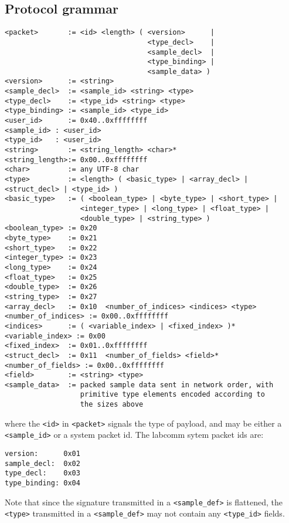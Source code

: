 \documentclass[a4paper]{article}
\begin{document}
\subsection{Protocol grammar}
\label{sec:ConcreteGrammar}
\begin{lstlisting}[basicstyle=\footnotesize\ttfamily]
<packet>       := <id> <length> ( <version>      | 
                                  <type_decl>    | 
                                  <sample_decl>  |
                                  <type_binding> |
                                  <sample_data> )
<version>      := <string>
<sample_decl>  := <sample_id> <string> <type>
<type_decl>    := <type_id> <string> <type>
<type_binding> := <sample_id> <type_id>
<user_id>      := 0x40..0xffffffff  
<sample_id> : <user_id>
<type_id>   : <user_id>
<string>       := <string_length> <char>*
<string_length>:= 0x00..0xffffffff  
<char>         := any UTF-8 char
<type>         := <length> ( <basic_type> | <array_decl> | <struct_decl> | <type_id> )
<basic_type>   := ( <boolean_type> | <byte_type> | <short_type> |
                  <integer_type> | <long_type> | <float_type> |
                  <double_type> | <string_type> )
<boolean_type> := 0x20 
<byte_type>    := 0x21 
<short_type>   := 0x22 
<integer_type> := 0x23 
<long_type>    := 0x24 
<float_type>   := 0x25 
<double_type>  := 0x26 
<string_type>  := 0x27 
<array_decl>   := 0x10  <number_of_indices> <indices> <type>
<number_of_indices> := 0x00..0xffffffff  
<indices>      := ( <variable_index> | <fixed_index> )*
<variable_index> := 0x00  
<fixed_index>  := 0x01..0xffffffff  
<struct_decl>  := 0x11  <number_of_fields> <field>*
<number_of_fields> := 0x00..0xffffffff  
<field>        := <string> <type>
<sample_data>  := packed sample data sent in network order, with
                  primitive type elements encoded according to
                  the sizes above
\end{lstlisting}
where the \verb+<id>+ in \verb+<packet>+ signals the type of payload,
and may be either a \verb+<sample_id>+ or a system packet id.
The labcomm sytem packet ids are:
\begin{lstlisting}[basicstyle=\footnotesize\ttfamily]
version:      0x01 
sample_decl:  0x02 
type_decl:    0x03 
type_binding: 0x04          
\end{lstlisting}
Note that since the signature transmitted in a \verb+<sample_def>+ is
flattened, the \verb+<type>+ transmitted in a \verb+<sample_def>+ may
not contain any \verb+<type_id>+ fields.
\end{document}
